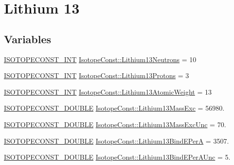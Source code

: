 \hypertarget{group___isotope_const-_lithium-_li13}{}\section{Lithium 13}
\label{group___isotope_const-_lithium-_li13}
\subsection*{Variables}
\begin{DoxyCompactItemize}
\item 
\mbox{\hyperlink{group___isotope_const-_macros_ga5f18360b3e99483a35c32d789e62621c}{I\+S\+O\+T\+O\+P\+E\+C\+O\+N\+S\+T\+\_\+\+I\+NT}} \mbox{\hyperlink{group___isotope_const-_lithium-_li13_gabb378c55eefb95314d2423b7b9945a61}{Isotope\+Const\+::\+Lithium13\+Neutrons}} = 10
\item 
\mbox{\hyperlink{group___isotope_const-_macros_ga5f18360b3e99483a35c32d789e62621c}{I\+S\+O\+T\+O\+P\+E\+C\+O\+N\+S\+T\+\_\+\+I\+NT}} \mbox{\hyperlink{group___isotope_const-_lithium-_li13_ga9d116941cec8a1330f91245759304940}{Isotope\+Const\+::\+Lithium13\+Protons}} = 3
\item 
\mbox{\hyperlink{group___isotope_const-_macros_ga5f18360b3e99483a35c32d789e62621c}{I\+S\+O\+T\+O\+P\+E\+C\+O\+N\+S\+T\+\_\+\+I\+NT}} \mbox{\hyperlink{group___isotope_const-_lithium-_li13_ga930a3c27c9282049658137adb67fc490}{Isotope\+Const\+::\+Lithium13\+Atomic\+Weight}} = 13
\item 
\mbox{\hyperlink{group___isotope_const-_macros_ga8f45a7272ce02c0b4c65c44636ed719a}{I\+S\+O\+T\+O\+P\+E\+C\+O\+N\+S\+T\+\_\+\+D\+O\+U\+B\+LE}} \mbox{\hyperlink{group___isotope_const-_lithium-_li13_ga81858c219edea4b3a884e0866293880c}{Isotope\+Const\+::\+Lithium13\+Mass\+Exc}} = 56980.
\item 
\mbox{\hyperlink{group___isotope_const-_macros_ga8f45a7272ce02c0b4c65c44636ed719a}{I\+S\+O\+T\+O\+P\+E\+C\+O\+N\+S\+T\+\_\+\+D\+O\+U\+B\+LE}} \mbox{\hyperlink{group___isotope_const-_lithium-_li13_gaed075b3fb8d560bcb741bbf3e72bf08b}{Isotope\+Const\+::\+Lithium13\+Mass\+Exc\+Unc}} = 70.
\item 
\mbox{\hyperlink{group___isotope_const-_macros_ga8f45a7272ce02c0b4c65c44636ed719a}{I\+S\+O\+T\+O\+P\+E\+C\+O\+N\+S\+T\+\_\+\+D\+O\+U\+B\+LE}} \mbox{\hyperlink{group___isotope_const-_lithium-_li13_ga1e7003c058d9179452fc705e1928b414}{Isotope\+Const\+::\+Lithium13\+Bind\+E\+PerA}} = 3507.
\item 
\mbox{\hyperlink{group___isotope_const-_macros_ga8f45a7272ce02c0b4c65c44636ed719a}{I\+S\+O\+T\+O\+P\+E\+C\+O\+N\+S\+T\+\_\+\+D\+O\+U\+B\+LE}} \mbox{\hyperlink{group___isotope_const-_lithium-_li13_ga532cfe35c656bf387f14983db189ba62}{Isotope\+Const\+::\+Lithium13\+Bind\+E\+Per\+A\+Unc}} = 5.

\end{DoxyCompactItemize}
